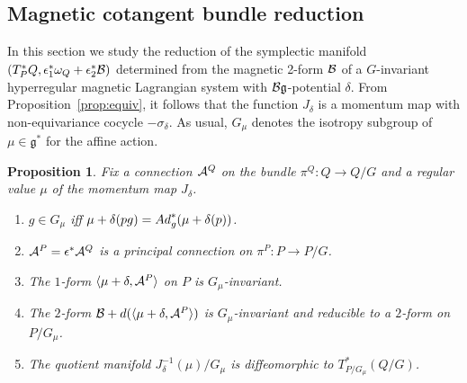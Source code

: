 \documentclass[11pt]{article}
\newtheorem{proposition}{Proposition}
\newcommand{\A}{{\cal A}}
\newcommand{\B}{{\cal B}}
\newcommand{\e}{\epsilon}
\newcommand{\lag}{\mathfrak{g}}
\begin{document}
\subsection{Magnetic cotangent bundle reduction}\label{section5.1}

In this section we study the reduction of the symplectic manifold $(T_P^*Q, \e_1^*\omega_Q +\e^*_2\B)$ determined from the magnetic 2-form $\B$ of a $G$-invariant hyperregular magnetic Lagrangian system with $\B\lag$-potential $\delta$. From Proposition~\ref{prop:equiv}, it follows that the function $J_\delta$ is a momentum map with non-equivariance cocycle $-\sigma_\delta$.  As usual, $G_\mu$ denotes the isotropy subgroup of $\mu\in\lag^*$ for the af\/f\/ine action.


\begin{proposition} Fix a connection $\A^Q$ on the bundle $\pi^Q: Q\to Q/G$ and a regular value $\mu$ of the momentum map $J_\delta$.
\begin{enumerate}\itemsep=0pt
\item[$1.$] $g\in G_\mu$ iff $\mu+\delta(pg)= {\rm Ad}_g^*(\mu+\delta(p))$.
\item[$2.$] $\A^P=\e^*\A^Q$ is a principal connection on $\pi^P:P\to P/G$.
\item[$3.$] The $1$-form $\langle \mu+\delta,\A^P\rangle$ on $P$ is $G_\mu$-invariant.
\item[$4.$]  The $2$-form $\B + d(\langle \mu+\delta,\A^P\rangle)$ is $G_\mu$-invariant and reducible to a $2$-form on $P/G_\mu$.
\item[$5.$] The quotient manifold $J_\delta^{-1}(\mu)/G_\mu$ is diffeomorphic to $T^*_{P/G_\mu}(Q/G)$.
\end{enumerate}
\end{proposition}
\end{document}
